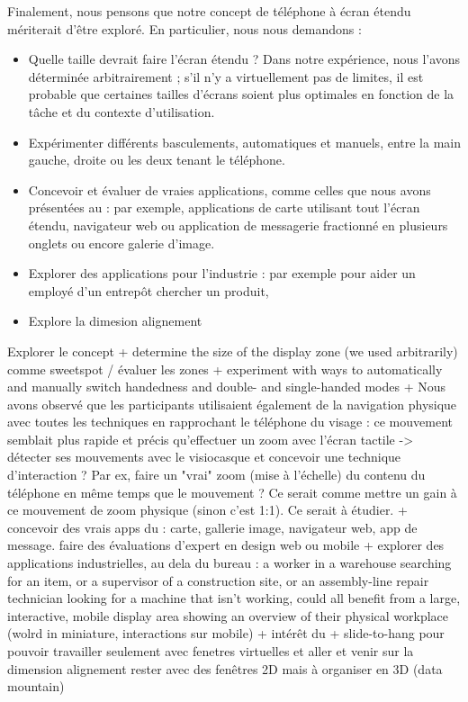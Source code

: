 Finalement, nous pensons que notre concept de téléphone à écran étendu mériterait d'être exploré. En particulier, nous nous demandons :
\begin{itemize}
  \item Quelle taille devrait faire l'écran étendu ? Dans notre expérience, nous l'avons déterminée arbitrairement ; s'il n'y a virtuellement pas de limites, il est probable que certaines tailles d'écrans soient plus optimales en fonction de la tâche et du contexte d'utilisation.
  \item Expérimenter différents basculements, automatiques et manuels, entre la main gauche, droite ou les deux tenant le téléphone.
  \item Concevoir et évaluer de vraies applications, comme celles que nous avons présentées au \cite{ch:concept} : par exemple, applications de carte utilisant tout l'écran étendu, navigateur web ou application de messagerie fractionné en plusieurs onglets ou encore galerie d'image.
  \item Explorer des applications pour l'industrie : par exemple pour aider un employé d'un entrepôt chercher un produit,
  \item Explore la dimesion alignement
\end{itemize}
Explorer le concept
+ determine the size of the display zone (we used arbitrarily) comme sweetspot / évaluer les zones
+ experiment with ways to automatically and manually switch handedness and double- and single-handed modes
+ Nous avons observé que les participants utilisaient également de la navigation physique avec toutes les techniques en rapprochant le téléphone du visage : ce mouvement semblait plus rapide et précis qu'effectuer un zoom avec l'écran tactile -> détecter ses mouvements avec le visiocasque et concevoir une technique d'interaction ? Par ex, faire un "vrai" zoom (mise à l'échelle) du contenu du téléphone en même temps que le mouvement ? Ce serait comme mettre un gain à ce mouvement de zoom physique (sinon c'est 1:1). Ce serait à étudier.
+ concevoir des vrais apps du \cite{ch:concept} : carte, gallerie image, navigateur web, app de message. faire des évaluations d'expert en design web ou mobile
+ explorer des applications industrielles, au dela du bureau : a worker in a warehouse searching for an item, or a supervisor of a  construction site, or an assembly-line repair technician looking for a machine that isn't working, could all benefit from a large, interactive, mobile display area showing an overview of their physical workplace (wolrd in miniature, interactions sur mobile) + intérêt du + slide-to-hang pour pouvoir travailler seulement avec fenetres virtuelles et aller et venir sur la dimension alignement \cite{tab:ar_os}
rester avec des fenêtres 2D mais à organiser en 3D (data mountain)